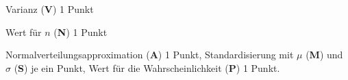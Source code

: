 \begin{bewertung}
\begin{teilaufgaben}
\item Varianz ({\bf V}) 1 Punkt
\item Wert für $n$ ({\bf N}) 1 Punkt
\item Normalverteilungsapproximation ({\bf A}) 1 Punkt,
Standardisierung mit $\mu$ ({\bf M}) und $\sigma$ ({\bf S}) je ein Punkt,
Wert für die Wahrscheinlichkeit ({\bf P}) 1 Punkt.
\end{teilaufgaben}
\end{bewertung}


